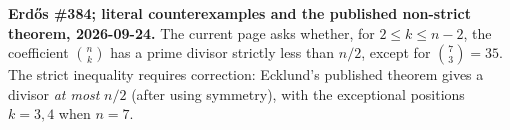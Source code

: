 \textbf{Erd\H{o}s \#384; literal counterexamples and the published non-strict theorem, 2026-09-24.}
The current page asks whether, for $2\leq k\leq n-2$, the coefficient $\binom nk$ has a prime divisor strictly less than $n/2$, except for $\binom73=35$. The strict inequality requires correction: Ecklund's published theorem gives a divisor \emph{at most} $n/2$ (after using symmetry), with the exceptional positions $k=3,4$ when $n=7$.
